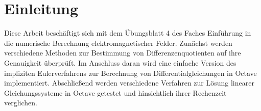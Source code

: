 \chapter{Einleitung}\label{sec:intro}
Diese Arbeit beschäftigt sich mit dem Übungsblatt 4 des Faches \glqq Einführung in die numerische Berechnung elektromagnetischer Felder\grqq{}. Zunächst werden verschiedene Methoden zur Bestimmung von Differenzenquotienten auf ihre Genauigkeit überprüft. Im Anschluss daran wird eine einfache Version des impliziten Eulerverfahrens zur Berechnung von Differentialgleichungen in Octave implementiert.
Abschließend werden verschiedene Verfahren zur Lösung linearer Gleichungssysteme in Octave getestet und hinsichtlich ihrer Rechenzeit verglichen.